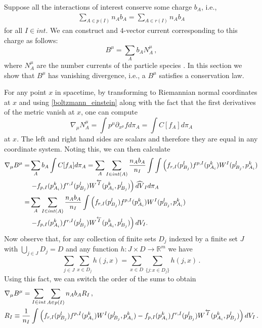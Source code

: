 Suppose all the interactions of interest conserve some charge $b_A$, i.e.,
 \begin{align}\label{eq:conserved_charge}
\sum_{A\in p(I)} n_Ab_A=\sum_{A\in r(I)} n_Ab_A
\end{align}
for all $I\in int$.   We can construct and $4$-vector current corresponding to this charge as follows:
\begin{equation}
B^\mu=\sum_A b_A N_A^\mu\,,
\end{equation}
where $N^\mu_A$ are the number currents of the particle species .  In this section we show that $B^\mu$ has vanishing divergence,  i.e., a $B^\mu$ satisfies a conservation law.

For any point $x$ in spacetime,  by transforming to Riemannian normal coordinates at   $x$ and using \eqref{boltzmann_einstein} along with the fact that the first derivatives of the metric vanish at $x$,  one can compute
\begin{equation}\label{use_normal_coords}
\nabla_\mu N_A^\mu=\int p^\mu \partial_{x^\mu} f d\pi_A=\int C[f_A] d\pi_A
\end{equation}
at $x$. The left and right hand sides are scalars   and therefore they are equal in any coordinate system. Noting this, we can then calculate
\begin{align}
\nabla_\mu B^\mu=&\sum_A b_A\int C[f_A]d\pi_A=\sum_A\sum_{I\in int(A)} \frac{n_Ab_A}{n_I}\int\int\left(f_{r,I}(p_{B_j}^l)f^{p,I}(p_{A_i}^k)W^I(p_{B_j}^l,p_{A_i}^k) \right.\\
&\left. -f_{p,I}(p_{A_i}^k)f^{r,I}(p_{B_j}^l)W^{\overleftarrow{I}}(p_{A_i}^k,p_{B_j}^l)\right)\widehat{dV}_I d\pi_A\notag\\
=&\sum_A\sum_{I\in int(A)} \frac{n_Ab_A}{n_I}\int\left(f_{r,I}(p_{B_j}^l)f^{p,I}(p_{A_i}^k)W^I(p_{B_j}^l,p_{A_i}^k) \right.\notag\\
&\left. -f_{p,I}(p_{A_i}^k)f^{r,I}(p_{B_j}^l)W^{\overleftarrow{I}}(p_{A_i}^k,p_{B_j}^l)\right)  dV_I.\notag
\end{align}
Now observe that, for any collection of finite sets $D_j$ indexed by a finite set $J$ with $\bigcup_{j\in J}D_j=D$ and any function $h:J\times D\rightarrow \mathbb{R}^m$ we have
\begin{equation}\label{sum_lemma}
\sum_{j\in J}\sum_{x\in D_j} h(j,x)=\sum_{x\in D}\sum_{\{j:x\in D_j\}}h(j,x)\,.
\end{equation}
Using this fact, we can switch the order of the sums to obtain
\begin{align}\label{del_B}
&\nabla_\mu B^\mu=\sum_{I\in int}\sum_{A\in p(I)} n_Ab_A R_I \,,\\
&R_I\equiv \frac{1}{n_I}\int\left(f_{r,I}(p_{B_j}^l)f^{p,I}(p_{A_i}^k)W^I(p_{B_j}^l,p_{A_i}^k)  -f_{p,I}(p_{A_i}^k)f^{r,I}(p_{B_j}^l)W^{\overleftarrow{I}}(p_{A_i}^k,p_{B_j}^l)\right)  dV_I\,.\notag
\end{align}
